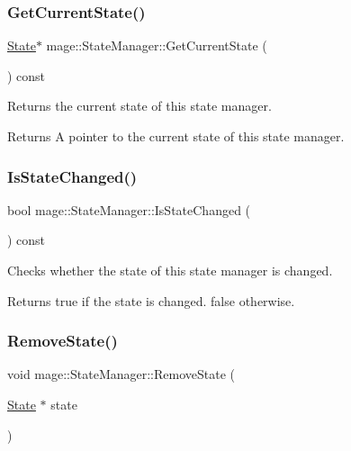 \subsubsection{\texorpdfstring{Get\+Current\+State()}{GetCurrentState()}}
{\footnotesize\ttfamily \hyperlink{classmage_1_1_state}{State}$\ast$ mage\+::\+State\+Manager\+::\+Get\+Current\+State (\begin{DoxyParamCaption}{ }\end{DoxyParamCaption}) const}

Returns the current state of this state manager.

\begin{DoxyReturn}{Returns}
A pointer to the current state of this state manager. 
\end{DoxyReturn}
\hypertarget{classmage_1_1_state_manager_abd9c136e1a0f7e375450be5e50e2fc64}{}\label{classmage_1_1_state_manager_abd9c136e1a0f7e375450be5e50e2fc64} 
\subsubsection{\texorpdfstring{Is\+State\+Changed()}{IsStateChanged()}}
{\footnotesize\ttfamily bool mage\+::\+State\+Manager\+::\+Is\+State\+Changed (\begin{DoxyParamCaption}{ }\end{DoxyParamCaption}) const}

Checks whether the state of this state manager is changed.

\begin{DoxyReturn}{Returns}
{\ttfamily true} if the state is changed. {\ttfamily false} otherwise. 
\end{DoxyReturn}
\hypertarget{classmage_1_1_state_manager_ad1589f7792508f0568f673b925a2bdba}{}\label{classmage_1_1_state_manager_ad1589f7792508f0568f673b925a2bdba} 
\subsubsection{\texorpdfstring{Remove\+State()}{RemoveState()}}
{\footnotesize\ttfamily void mage\+::\+State\+Manager\+::\+Remove\+State (\begin{DoxyParamCaption}\item[{\hyperlink{classmage_1_1_state}{State} $\ast$}]{state }\end{DoxyParamCaption})}

